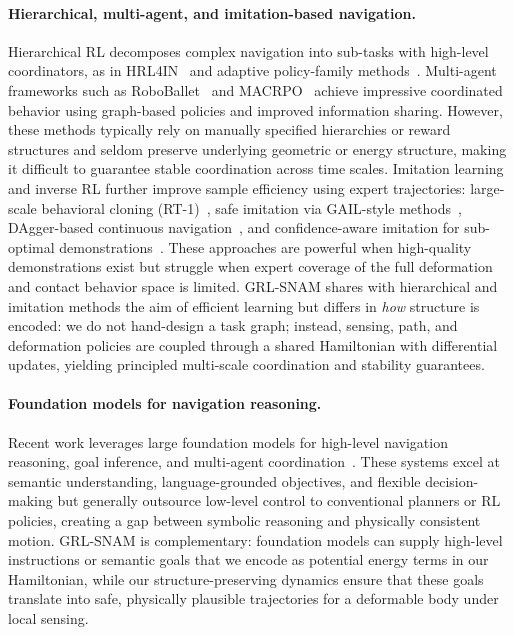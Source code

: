 \documentclass{article} %
\begin{document}
\paragraph{Hierarchical, multi-agent, and imitation-based navigation.}
Hierarchical RL decomposes complex navigation into sub-tasks with high-level coordinators, as in HRL4IN~\citep{li2020hrl4in} and adaptive policy-family methods~\citep{lee2023adaptive}. Multi-agent frameworks such as RoboBallet~\citep{lai2025roboballet} and MACRPO~\citep{macrpo2024} achieve impressive coordinated behavior using graph-based policies and improved information sharing. However, these methods typically rely on manually specified hierarchies or reward structures and seldom preserve underlying geometric or energy structure, making it difficult to guarantee stable coordination across time scales. Imitation learning and inverse RL further improve sample efficiency using expert trajectories: large-scale behavioral cloning (RT-1)~\citep{brohan2022rt1}, safe imitation via GAIL-style methods~\citep{gail2024safe}, DAgger-based continuous navigation~\citep{shi2025dagger}, and confidence-aware imitation for sub-optimal demonstrations~\citep{confident2024il}. These approaches are powerful when high-quality demonstrations exist but struggle when expert coverage of the full deformation and contact behavior space is limited. GRL-SNAM shares with hierarchical and imitation methods the aim of efficient learning but differs in \emph{how} structure is encoded: we do not hand-design a task graph; instead, sensing, path, and deformation policies are coupled through a shared Hamiltonian with differential updates, yielding principled multi-scale coordination and stability guarantees.

\paragraph{Foundation models for navigation reasoning.}
Recent work leverages large foundation models for high-level navigation reasoning, goal inference, and multi-agent coordination~\citep{zhu2024navi2gazeleveragingfoundationmodels,llm2025nav}. These systems excel at semantic understanding, language-grounded objectives, and flexible decision-making but generally outsource low-level control to conventional planners or RL policies, creating a gap between symbolic reasoning and physically consistent motion. GRL-SNAM is complementary: foundation models can supply high-level instructions or semantic goals that we encode as potential energy terms in our Hamiltonian, while our structure-preserving dynamics ensure that these goals translate into safe, physically plausible trajectories for a deformable body under local sensing.
\end{document}
